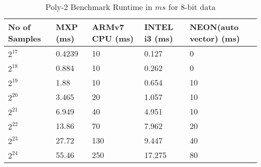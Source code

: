 \begin{table}[htbp]
	\centering
		\begin{adjustbox}{width=.9\textwidth}
		\small
	\begin{tabular}{lllll}
		\toprule
		\textbf{No of Samples} & \textbf{MXP (ms)} & \textbf{ARMv7 CPU (ms)} & \textbf{INTEL i3 (ms)} & \textbf{NEON(auto vector) (ms)} \\
		\midrule
		$2^{17}$ & 0.4239 & 10 & 0.127 & 0 \\
		$2^{18}$ & 0.884 & 10 & 0.262 & 0 \\
		$2^{19}$ & 1.88 & 10 & 0.654 & 10 \\
		$2^{20}$ & 3.465 & 20 & 1.057 & 10 \\
		$2^{21}$ & 6.949 & 40 & 4.951 & 10 \\
		$2^{22}$ & 13.86 & 70 & 7.962 & 20 \\
		$2^{23}$ & 27.72 & 130 & 9.447 & 40 \\
		$2^{24}$ & 55.46 & 250 & 17.275 & 80 \\
		\bottomrule
	\end{tabular}%
    \end{adjustbox}%
   \caption{Poly-2 Benchmark Runtime in $ms$ for 8-bit data}
	\label{x:20}%
\end{table}%
